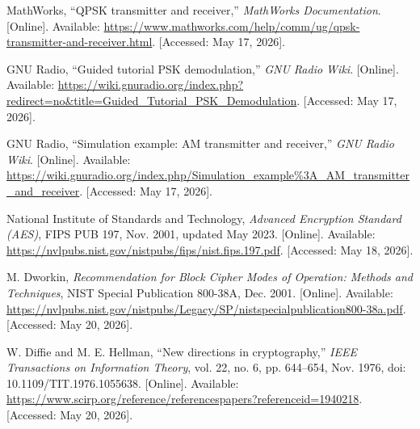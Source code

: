 \documentclass[12pt]{article}
\begin{document}
\begin{enumerate}[label={\textbf{[\arabic*]}},leftmargin=0.55in]
    \item MathWorks, ``QPSK transmitter and receiver,'' \textit{MathWorks Documentation}. [Online]. Available: \url{https://www.mathworks.com/help/comm/ug/qpsk-transmitter-and-receiver.html}. [Accessed: May 17, 2026].
    \item GNU Radio, ``Guided tutorial PSK demodulation,'' \textit{GNU Radio Wiki}. [Online]. Available: \url{https://wiki.gnuradio.org/index.php?redirect=no&title=Guided_Tutorial_PSK_Demodulation}. [Accessed: May 17, 2026].
    \item GNU Radio, ``Simulation example: AM transmitter and receiver,'' \textit{GNU Radio Wiki}. [Online]. Available: \url{https://wiki.gnuradio.org/index.php/Simulation_example%3A_AM_transmitter_and_receiver}. [Accessed: May 17, 2026].
    \item National Institute of Standards and Technology, \textit{Advanced Encryption Standard (AES)}, FIPS PUB 197, Nov. 2001, updated May 2023. [Online]. Available: \url{https://nvlpubs.nist.gov/nistpubs/fips/nist.fips.197.pdf}. [Accessed: May 18, 2026].
    \item M. Dworkin, \textit{Recommendation for Block Cipher Modes of Operation: Methods and Techniques}, NIST Special Publication 800-38A, Dec. 2001. [Online]. Available: \url{https://nvlpubs.nist.gov/nistpubs/Legacy/SP/nistspecialpublication800-38a.pdf}. [Accessed: May 20, 2026].
    \item W. Diffie and M. E. Hellman, ``New directions in cryptography,'' \textit{IEEE Transactions on Information Theory}, vol. 22, no. 6, pp. 644--654, Nov. 1976, doi: 10.1109/TIT.1976.1055638. [Online]. Available: \url{https://www.scirp.org/reference/referencespapers?referenceid=1940218}. [Accessed: May 20, 2026].
\end{enumerate}
\end{document}
